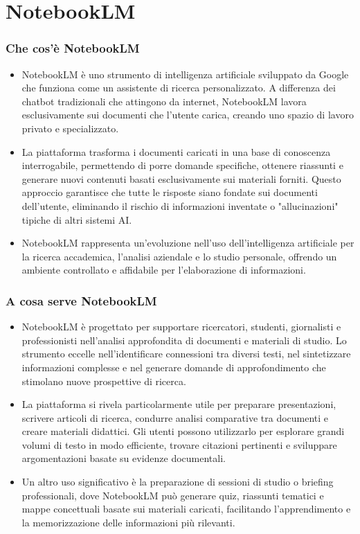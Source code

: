 \documentclass[aspectratio=169]{beamer}
\begin{document}
\section{NotebookLM}
%
%
\begin{frame}
\frametitle{Che cos'è NotebookLM}
\begin{itemize}
\item NotebookLM è uno strumento di intelligenza artificiale sviluppato da Google che funziona come un assistente di ricerca personalizzato. A differenza dei chatbot tradizionali che attingono da internet, NotebookLM lavora esclusivamente sui documenti che l'utente carica, creando uno spazio di lavoro privato e specializzato.

\item La piattaforma trasforma i documenti caricati in una base di conoscenza interrogabile, permettendo di porre domande specifiche, ottenere riassunti e generare nuovi contenuti basati esclusivamente sui materiali forniti. Questo approccio garantisce che tutte le risposte siano fondate sui documenti dell'utente, eliminando il rischio di informazioni inventate o "allucinazioni" tipiche di altri sistemi AI.

\item NotebookLM rappresenta un'evoluzione nell'uso dell'intelligenza artificiale per la ricerca accademica, l'analisi aziendale e lo studio personale, offrendo un ambiente controllato e affidabile per l'elaborazione di informazioni.
\end{itemize}
\end{frame}
%
%
\begin{frame}
\frametitle{A cosa serve NotebookLM}
\begin{itemize}
\item NotebookLM è progettato per supportare ricercatori, studenti, giornalisti e professionisti nell'analisi approfondita di documenti e materiali di studio. Lo strumento eccelle nell'identificare connessioni tra diversi testi, nel sintetizzare informazioni complesse e nel generare domande di approfondimento che stimolano nuove prospettive di ricerca.

\item La piattaforma si rivela particolarmente utile per preparare presentazioni, scrivere articoli di ricerca, condurre analisi comparative tra documenti e creare materiali didattici. Gli utenti possono utilizzarlo per esplorare grandi volumi di testo in modo efficiente, trovare citazioni pertinenti e sviluppare argomentazioni basate su evidenze documentali.

\item Un altro uso significativo è la preparazione di sessioni di studio o briefing professionali, dove NotebookLM può generare quiz, riassunti tematici e mappe concettuali basate sui materiali caricati, facilitando l'apprendimento e la memorizzazione delle informazioni più rilevanti.
\end{itemize}
\end{frame}
\end{document}
